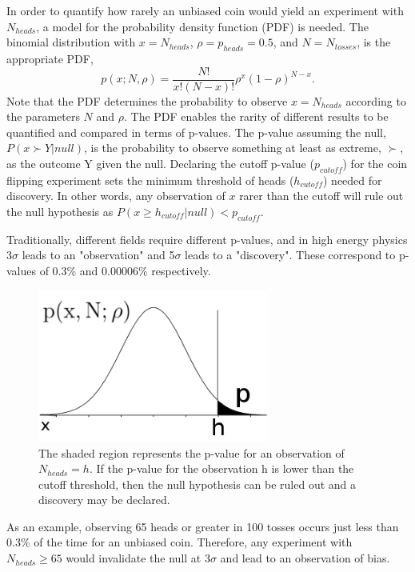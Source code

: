 \documentclass[12pt]{article}
\begin{document}
In order to quantify how rarely an unbiased coin would yield an experiment with $N_{heads}$, a model for the probability density function (PDF) is needed. The binomial distribution with $x = N_{heads}$, $\rho = p_{heads} = 0.5$, and $N = N_{tosses}$, is the appropriate PDF,
\begin{equation}
p(x;N,\rho) = \frac{N!}{x! (N - x)!}\rho^{x}(1-\rho)^{N-x}.
\end{equation}
Note that the PDF determines the probability to observe $x = N_{heads}$ according to the parameters $N$ and $\rho$. The PDF enables the rarity of different results to be quantified and compared in terms of p-values. The p-value assuming the null, $P(x \succ Y|null)$, is the probability to observe something at least as extreme, $\succ$, as the outcome Y given the null. Declaring the cutoff p-value ($p_{cutoff}$) for the coin flipping experiment sets the minimum threshold of heads ($h_{cutoff}$) needed for discovery. In other words, any observation of $x$ rarer than the cutoff will rule out the null hypothesis as $P(x \geq h_{cutoff}|null) < p_{cutoff}$. 

Traditionally, different fields require different p-values, and in high energy physics 3$\sigma$ leads to an "observation" and 5$\sigma$ leads to a "discovery". These correspond to p-values of 0.3\% and 0.00006\% respectively. 
\begin{figure}[h!]
  \centering
  \includegraphics[width=3in]{images/p-value.png}
  \caption[An illustrated example of a p-value.]
   {The shaded region represents the p-value for an observation of $N_{heads}=h$. If the p-value for the observation h is lower than the cutoff threshold, then the null hypothesis can be ruled out and a discovery may be declared.}
\label{fig:pvalue_ex}
\end{figure}
As an example, observing 65 heads or greater in 100 tosses occurs just less than 0.3\% of the time for an unbiased coin. Therefore, any experiment with $N_{heads} \geq 65$ would invalidate the null at $3\sigma$ and lead to an observation of bias.
\end{document}
